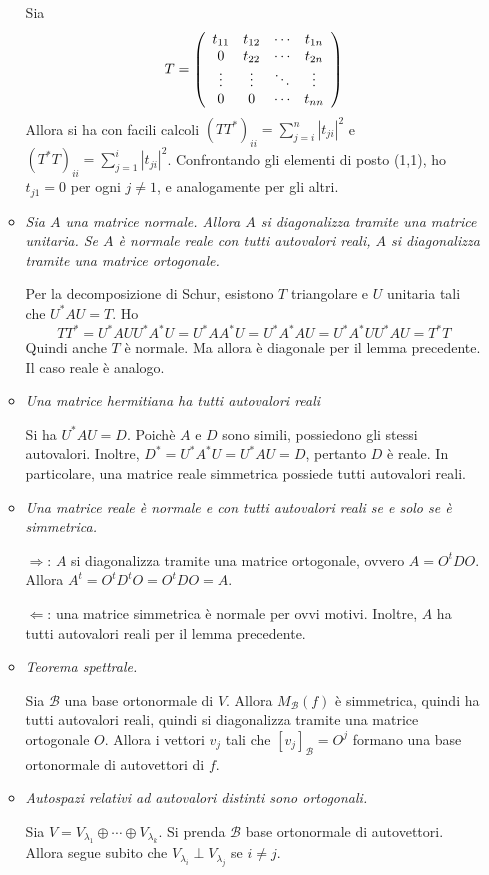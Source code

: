 \documentclass[a4paper,11pt]{article}
\newcommand{\tras}[1]{#1^t}						%
\newcommand{\agg}[1]{#1^*}							%
\newcommand{\base}[1]{\mathcal{#1}}				%
\begin{document}
\begin{enumerate}
\begin{itemize}
		\noindent Sia
		\[T=\left(\begin{array}{c c c c}
		t_{11}&t_{12}&\cdots&t_{1n}\\
		0&t_{22}&\cdots&t_{2n}\\
		\vdots&\vdots&\ddots&\vdots\\
		0&0&\cdots&t_{nn}
		\end{array}\right)\]
		Allora si ha con facili calcoli $(T\agg{T})_{ii}=\sum_{j=i}^{n}|t_{ji}|^2$ e $(\agg{T}T)_{ii}=\sum_{j=1}^{i}|t_{ji}|^2$. Confrontando gli elementi di posto (1,1), ho $t_{j1}=0$ per ogni $j\neq1$, e analogamente per gli altri.
		\item \textit{Sia $A$ una matrice normale. Allora $A$ si diagonalizza tramite una matrice unitaria. Se $A$ è normale reale con tutti autovalori reali, $A$ si diagonalizza tramite una matrice ortogonale.}
		
		\noindent Per la decomposizione di Schur, esistono $T$ triangolare e $U$ unitaria tali che $\agg{U}AU=T$. Ho
		\[T\agg{T}=\agg{U}AU\agg{U}\agg{A}U=\agg{U}A\agg{A}U=\agg{U}\agg{A}AU=\agg{U}\agg{A}U\agg{U}AU=\agg{T}T\]
		Quindi anche $T$ è normale. Ma allora è diagonale per il lemma precedente. Il caso reale è analogo.
		\item \textit{Una matrice hermitiana ha tutti autovalori reali}
		
		\noindent Si ha $\agg{U}AU=D$. Poichè $A$ e $D$ sono simili, possiedono gli stessi autovalori. Inoltre, $\agg{D}=\agg{U}\agg{A}U=\agg{U}AU=D$, pertanto $D$ è reale. In particolare, una matrice reale simmetrica possiede tutti autovalori reali.
		\item \textit{Una matrice reale è normale e con tutti autovalori reali se e solo se è simmetrica.}
		
		\noindent $\Rightarrow$: $A$ si diagonalizza tramite una matrice ortogonale, ovvero $A=\tras{O}DO$. Allora $\tras{A}=\tras{O}\tras{D}O=\tras{O}DO=A$.
		
		$\Leftarrow$: una matrice simmetrica è normale per ovvi motivi. Inoltre, $A$ ha tutti autovalori reali per il lemma precedente.
		\item \textit{Teorema spettrale.}
		
		\noindent Sia $\base{B}$ una base ortonormale di $V$. Allora $M_\base{B}(f)$ è simmetrica, quindi ha tutti autovalori reali, quindi si diagonalizza tramite una matrice ortogonale $O$. Allora i vettori $v_j$ tali che $[v_j]_\base{B}=O^j$ formano una base ortonormale di autovettori di $f$.
		\item \textit{Autospazi relativi ad autovalori distinti sono ortogonali.}
		
		\noindent Sia $V=V_{\lambda_1}\oplus\cdots\oplus V_{\lambda_k}$. Si prenda $\base{B}$ base ortonormale di autovettori. Allora segue subito che $V_{\lambda_i}\perp V_{\lambda_j}$ se $i\neq j$.
	\end{itemize}
\end{enumerate}
\end{document}
